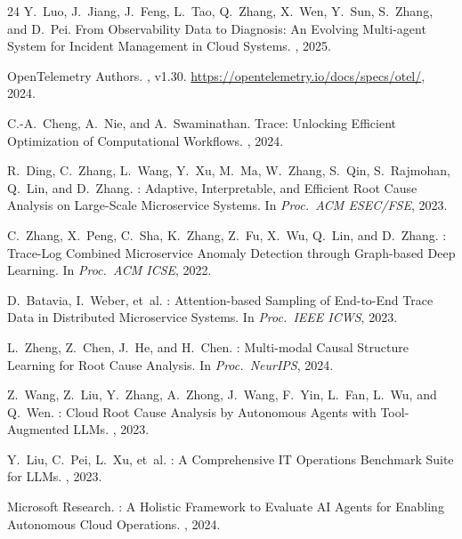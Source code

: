 \documentclass[sigconf,nonacm]{acmart}
\begin{document}
\begin{thebibliography}{24}
Y.~Luo, J.~Jiang, J.~Feng, L.~Tao, Q.~Zhang, X.~Wen, Y.~Sun, S.~Zhang, and
  D.~Pei.
\newblock From Observability Data to Diagnosis: An Evolving Multi-agent System
  for Incident Management in Cloud Systems.
, 2025.

{OpenTelemetry Authors}.
, v1.30.
\newblock \url{https://opentelemetry.io/docs/specs/otel/}, 2024.

C.-A.~Cheng, A.~Nie, and A.~Swaminathan.
\newblock Trace: Unlocking Efficient Optimization of Computational Workflows.
, 2024.

R.~Ding, C.~Zhang, L.~Wang, Y.~Xu, M.~Ma, W.~Zhang, S.~Qin, S.~Rajmohan,
  Q.~Lin, and D.~Zhang.
: Adaptive, Interpretable, and Efficient Root Cause
  Analysis on Large-Scale Microservice Systems.
\newblock In {\em Proc.\ ACM ESEC/FSE}, 2023.

C.~Zhang, X.~Peng, C.~Sha, K.~Zhang, Z.~Fu, X.~Wu, Q.~Lin, and D.~Zhang.
: Trace-Log Combined Microservice Anomaly Detection
  through Graph-based Deep Learning.
\newblock In {\em Proc.\ ACM ICSE}, 2022.

D.~Batavia, I.~Weber, et~al.
: Attention-based Sampling of End-to-End Trace Data in
  Distributed Microservice Systems.
\newblock In {\em Proc.\ IEEE ICWS}, 2023.

L.~Zheng, Z.~Chen, J.~He, and H.~Chen.
: Multi-modal Causal Structure Learning for Root Cause
  Analysis.
\newblock In {\em Proc.\ NeurIPS}, 2024.

Z.~Wang, Z.~Liu, Y.~Zhang, A.~Zhong, J.~Wang, F.~Yin, L.~Fan, L.~Wu, and
  Q.~Wen.
: Cloud Root Cause Analysis by Autonomous Agents with
  Tool-Augmented {LLMs}.
, 2023.

Y.~Liu, C.~Pei, L.~Xu, et~al.
: A Comprehensive {IT} Operations Benchmark Suite for
  {LLMs}.
, 2023.

{Microsoft Research}.
: A Holistic Framework to Evaluate {AI} Agents for Enabling
  Autonomous Cloud Operations.
, 2024.


\end{thebibliography}
\end{document}
